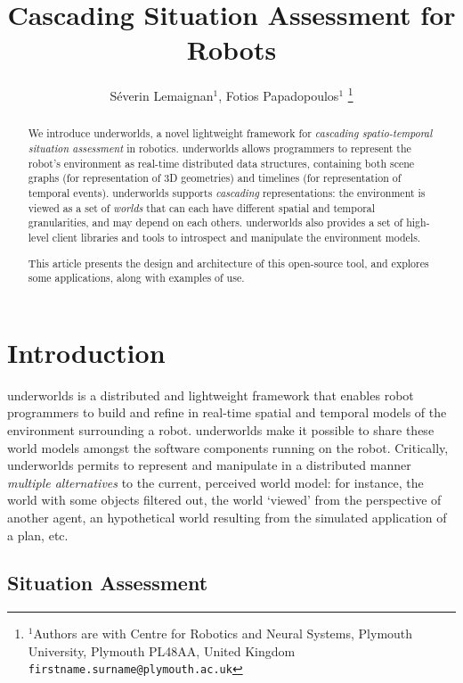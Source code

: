 \documentclass[letterpaper, 10 pt, conference]{ieeeconf}  %
\title{\LARGE \bf
Cascading Situation Assessment for Robots
}
\author{Séverin Lemaignan$^{1}$, Fotios Papadopoulos$^{1}$%
\thanks{$^{1}$Authors are with Centre for Robotics and Neural Systems,
        Plymouth University, Plymouth PL48AA, United Kingdom
        {\tt\small firstname.surname@plymouth.ac.uk}}%
}
\newcommand{\uwds}{{\sc underworlds}\xspace}
\begin{document}
\maketitle
\thispagestyle{empty}
\pagestyle{empty}


\begin{abstract}

    We introduce \uwds, a novel lightweight framework for \emph{cascading
    spatio-temporal situation assessment} in robotics. \uwds allows programmers
    to represent the robot's environment as real-time distributed data
    structures, containing both scene graphs (for representation of 3D
    geometries) and timelines (for representation of temporal events). \uwds
    supports \emph{cascading} representations: the environment is viewed as a
    set of \emph{worlds} that can each have different spatial and temporal
    granularities, and may depend on each others.  \uwds also provides a set of
    high-level client libraries and tools to introspect and manipulate the
    environment models.

    This article presents the design and architecture of this open-source tool,
    and explores some applications, along with examples of use.

\end{abstract}


\section{Introduction}


\uwds is a distributed and lightweight framework that enables robot programmers
to build and refine in real-time spatial and temporal models of the environment
surrounding a robot. \uwds make it possible to share these world models amongst
the software components running on the robot. Critically, \uwds permits to
represent and manipulate in a distributed manner \emph{multiple alternatives} to
the current, perceived world model: for instance, the world with some objects filtered out,
the world `viewed' from the perspective of another agent, an hypothetical world
resulting from the simulated application of a plan, etc.


\subsection{Situation Assessment}
\end{document}
